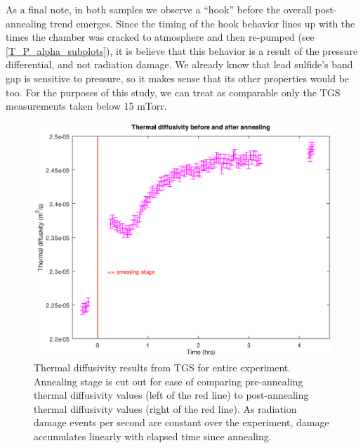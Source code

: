As a final note, in both samples we observe a ``hook'' before the overall post-annealing trend emerges. Since the timing of the hook behavior lines up with the times the chamber was cracked to atmosphere and then re-pumped (see \ref{T_P_alpha_subplots}), it is believe that this behavior is a result of the pressure differential, and not radiation damage. We already know that lead sulfide's band gap is sensitive to pressure, so it makes sense that its other properties would be too. For the purposes of this study, we can treat as comparable only the TGS measurements taken below 15 mTorr.








\begin{figure}[pt]
\begin{center}
\includegraphics[width=\textwidth]{./images/thermal_diffusivity_pre_post.eps}
\caption{Thermal diffusivity results from TGS for entire experiment. Annealing stage is cut out for ease of comparing pre-annealing thermal diffusivity values (left of the red line) to post-annealing thermal diffusivity values (right of the red line). As radiation damage events per second are constant over the experiment, damage accumulates linearly with elapsed time since annealing.}
\label{thermal_diffusivity_pre_post}
\end{center}
\end{figure}


